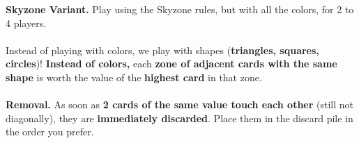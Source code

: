 \documentclass[a4paper]{memoir}
\begin{document}
{\footnotesize

\noindent 
\textbf{ Skyzone Variant.} 
Play using the Skyzone rules, but with all the colors, for 2 to 4 players.
\\
\\
\noindent
{} Instead of playing with colors, we play with shapes (\textbf{triangles, squares, circles})!  
\textbf{Instead of colors,} each \textbf{zone of adjacent cards with the same shape} is worth the value of the \textbf{highest card} in that zone.
\\
\\
\noindent
\textbf{ Removal.} 
As soon as \textbf{2 cards of the same value touch each other} (still not diagonally), they are \textbf{immediately discarded}.  
Place them in the discard pile in the order you prefer.
}
\end{document}
